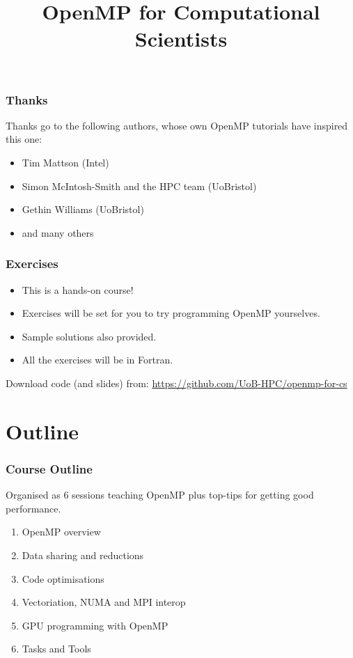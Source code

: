 \documentclass{beamer}
\title{OpenMP for Computational Scientists}
\begin{document}
\frame{\titlepage}

\begin{frame}
\frametitle{Thanks}
Thanks go to the following authors, whose own OpenMP tutorials have inspired this one:
\begin{itemize}
  \item Tim Mattson (Intel)
  \item Simon McIntosh-Smith and the HPC team (UoBristol)
  \item Gethin Williams (UoBristol)
  \item and many others
\end{itemize}
\end{frame}

\begin{frame}
\frametitle{Exercises}
\begin{itemize}
\item This is a hands-on course!
\item Exercises will be set for you to try programming OpenMP yourselves.
\item Sample solutions also provided.
\item All the exercises will be in Fortran.
\end{itemize}

Download code (and slides) from:
\url{https://github.com/UoB-HPC/openmp-for-cs}
\end{frame}

\section{Outline}
\begin{frame}
\frametitle{Course Outline}
Organised as 6 sessions teaching OpenMP plus top-tips for getting good performance.
\begin{enumerate}
  \item OpenMP overview
  \item Data sharing and reductions
  \item Code optimisations
  \item Vectoriation, NUMA and MPI interop
  \item GPU programming with OpenMP
  \item Tasks and Tools
\end{enumerate}
\end{frame}
\end{document}
